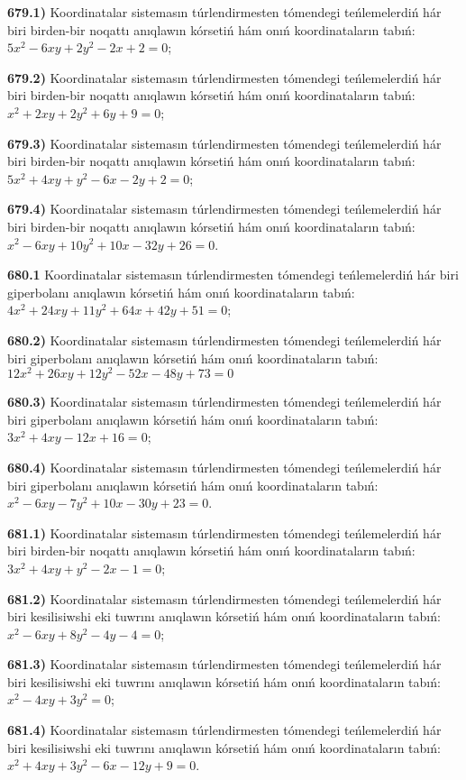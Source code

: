 \textbf{679.1)} Koordinatalar sistemasın túrlendirmesten tómendegi teńlemelerdiń hár biri birden-bir noqattı anıqlawın kórsetiń hám onıń koordinataların tabıń: $5 x^2-6 x y+2 y^2-2 x+2=0$;

\textbf{679.2)} Koordinatalar sistemasın túrlendirmesten tómendegi teńlemelerdiń hár biri birden-bir noqattı anıqlawın kórsetiń hám onıń koordinataların tabıń: $x^2+2 x y+2 y^2+6 y+9=0$;

\textbf{679.3)} Koordinatalar sistemasın túrlendirmesten tómendegi teńlemelerdiń hár biri birden-bir noqattı anıqlawın kórsetiń hám onıń koordinataların tabıń: $5 x^2+4 x y+y^2-6 x-2 y+2=0$;

\textbf{679.4)} Koordinatalar sistemasın túrlendirmesten tómendegi teńlemelerdiń hár biri birden-bir noqattı anıqlawın kórsetiń hám onıń koordinataların tabıń: $x^2-6 x y+10 y^2+10 x-32 y+26=0$.

\textbf{680.1} Koordinatalar sistemasın túrlendirmesten tómendegi teńlemelerdiń hár biri giperbolanı anıqlawın kórsetiń hám onıń koordinataların tabıń: $4 x^2+24 x y+11 y^2+64 x+42 y+51=0$;

\textbf{680.2)} Koordinatalar sistemasın túrlendirmesten tómendegi teńlemelerdiń hár biri giperbolanı anıqlawın kórsetiń hám onıń koordinataların tabıń: $12 x^2+26 x y+12 y^2-52 x-48 y+73=0$

\textbf{680.3)} Koordinatalar sistemasın túrlendirmesten tómendegi teńlemelerdiń hár biri giperbolanı anıqlawın kórsetiń hám onıń koordinataların tabıń: $3 x^2+4 x y-12 x+16=0$;

\textbf{680.4)} Koordinatalar sistemasın túrlendirmesten tómendegi teńlemelerdiń hár biri giperbolanı anıqlawın kórsetiń hám onıń koordinataların tabıń: $x^2-6 x y-7 y^2+10 x-30 y+23=0$.

\textbf{681.1)} Koordinatalar sistemasın túrlendirmesten tómendegi teńlemelerdiń hár biri birden-bir noqattı anıqlawın kórsetiń hám onıń koordinataların tabıń: $3 x^2+4 x y+y^2-2 x-1=0$;

\textbf{681.2)} Koordinatalar sistemasın túrlendirmesten tómendegi teńlemelerdiń hár biri kesilisiwshi eki tuwrını anıqlawın kórsetiń hám onıń koordinataların tabıń: $x^2-6 x y+8 y^2-4 y-4=0$;

\textbf{681.3)} Koordinatalar sistemasın túrlendirmesten tómendegi teńlemelerdiń hár biri kesilisiwshi eki tuwrını anıqlawın kórsetiń hám onıń koordinataların tabıń: $x^2-4 x y+3 y^2=0$;

\textbf{681.4)} Koordinatalar sistemasın túrlendirmesten tómendegi teńlemelerdiń hár biri kesilisiwshi eki tuwrını anıqlawın kórsetiń hám onıń koordinataların tabıń: $x^2+4 x y+3 y^2-6 x-12 y+9=0$.

